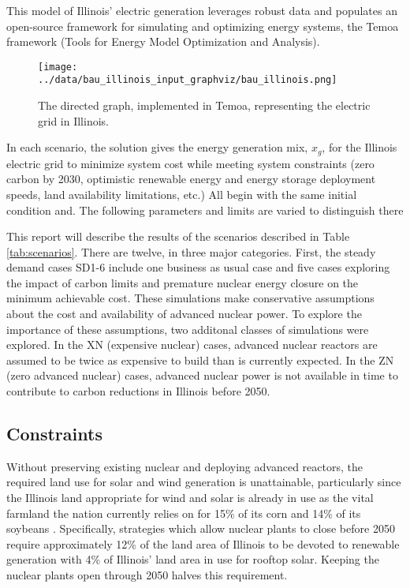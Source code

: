 This model of Illinois' electric generation leverages robust data and populates 
an open-source framework for simulating and optimizing energy systems, 
the Temoa framework (Tools for Energy Model Optimization and Analysis). 



\begin{figure}
\begin{minipage}{.45\linewidth}
  \centering
\texttt{[image: ../data/bau\_illinois\_input\_graphviz/bau\_illinois.png]}
\caption{The directed graph, implemented in Temoa, representing the electric grid in Illinois.} \label{fig:temoa_graph}
\end{minipage}%
\end{figure}


In each scenario, the solution gives the energy generation mix, $x_g$,
for the Illinois electric grid to minimize system cost while meeting system
constraints (zero carbon by 2030, optimistic renewable energy and energy
storage deployment speeds, land availability limitations, etc.)
All begin with the same initial condition and. The following parameters and limits are varied to distinguish there

This report will describe the results of the scenarios described in Table \ref{tab:scenarios}. 
There are twelve, in three major categories. First, the steady demand cases SD1-6 include one business as usual case and five cases exploring the impact of carbon limits and premature nuclear energy closure on the minimum achievable cost. These simulations make conservative assumptions about the cost and availability of advanced nuclear power. To explore the importance of these assumptions, two additonal classes of simulations were explored. In the XN (expensive nuclear) cases, advanced nuclear reactors are assumed to be twice as expensive to build than is currently expected. In the ZN (zero advanced nuclear) cases, advanced nuclear power is not available in time to contribute to carbon reductions in Illinois before 2050.  

\subsection{Constraints}

Without preserving existing nuclear and deploying advanced reactors, the
required land use for solar and wind generation is
unattainable, particularly since the Illinois land appropriate for wind and solar
is already in use as the vital farmland the nation currently relies on for 15\% of its
corn and 14\% of its soybeans \cite{schleusener_illinois_2020}.
Specifically, strategies which allow nuclear plants to close before 2050
require approximately 12\% of the land area of Illinois to be devoted to
renewable generation  with  4\% of Illinois' land area in use for rooftop solar.
Keeping the nuclear plants open through 2050 halves this requirement.


